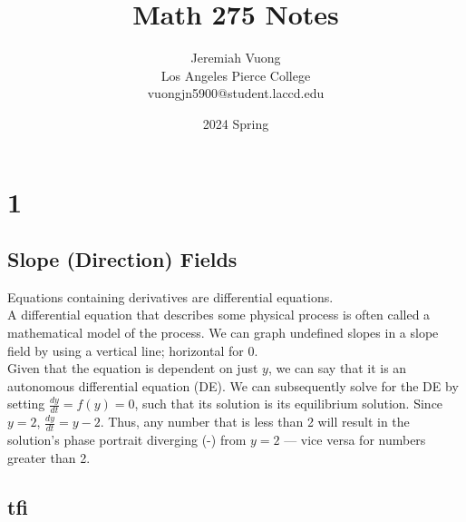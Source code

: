 \documentclass{article}
\title{\Huge{Math 275} Notes}
\author{\huge{Jeremiah Vuong}\\Los Angeles Pierce College\\vuongjn5900@student.laccd.edu
}
\date{2024 Spring}
\begin{document}
\maketitle
\newpage

\pagebreak

\section{1}
\subsection{Slope (Direction) Fields}
Equations containing derivatives are differential equations. \\
A differential equation that describes some physical process is often called a mathematical model of the process.
 \noindent
We can graph undefined slopes in a slope field by using a vertical line; horizontal for 0.
\sol \\
Given that the equation is dependent on just $y$, we can say that it is an autonomous differential equation (DE).
We can subsequently solve for the DE by setting $\frac{dy}{dt} = f(y) = 0$, such that its solution is its equilibrium solution.
Since $y=2$, $\boxed{\frac{dy}{dt} = y-2}$. Thus, any number that is less than 2 will result in the solution's phase portrait diverging (-) from $y=2$ --- vice versa for numbers greater than 2.
\subsection{tfi}
\end{document}
